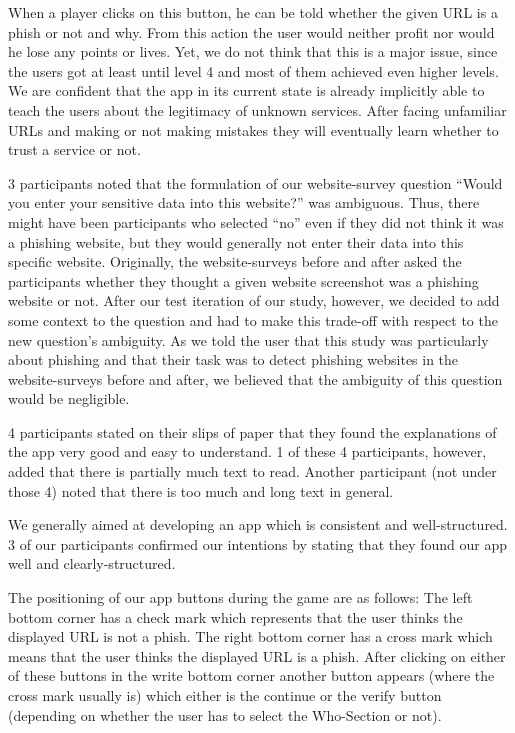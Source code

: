 \begin{description}[leftmargin=0cm]
When a player clicks on this button, he can be told whether the given URL is a phish or not and why.
From this action the user would neither profit nor would he lose any points or lives.
Yet, we do not think that this is a major issue, since the users got at least until level 4 and most of them achieved even higher levels.
We are confident that the app in its current state is already implicitly able to teach the users about the legitimacy of unknown services.
After facing unfamiliar URLs and making or not making mistakes they will eventually learn whether to trust a service or not.
	\item[Question to Data Entry:] 3 participants noted that the formulation of our website-survey question ``Would you enter your sensitive data into this website?'' was ambiguous.
Thus, there might have been participants who selected ``no'' even if they did not think it was a phishing website, but they would generally not enter their data into this specific website.
Originally, the website-surveys before and after asked the participants whether they thought a given website screenshot was a phishing website or not.
After our test iteration of our study, however, we decided to add some context to the question and had to make this trade-off with respect to the new question's ambiguity.
As we told the user that this study was particularly about phishing and that their task was to detect phishing websites in the website-surveys before and after, we believed that the ambiguity of this question would be negligible.
	\item[Explanations and Comprehensibility:]
4 participants stated on their slips of paper that they found the explanations of the app very good and easy to understand.
1 of these 4 participants, however, added that there is partially much text to read.
Another participant (not under those 4) noted that there is too much and long text in general.
	\item[App Structure:]
We generally aimed at developing an app which is consistent and well-structured.
3 of our participants confirmed our intentions by stating that they found our app well and clearly-structured.
	\item[Button Positioning:] The positioning of our app buttons during the game are as follows: 
The left bottom corner has a check mark which represents that the user thinks the displayed URL is not a phish.
The right bottom corner has a cross mark which means that the user thinks the displayed URL is a phish.
After clicking on either of these buttons in the write bottom corner another button appears (where the cross mark usually is) which either is the continue or the verify button (depending on whether the user has to select the Who-Section or not).

\end{description}
